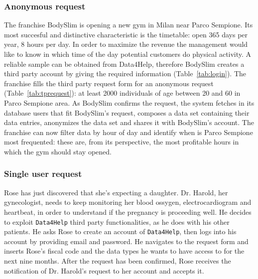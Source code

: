     \subsubsection{Anonymous request}

      The franchise BodySlim is opening a new gym in Milan near Parco Sempione. Its most succesful and distinctive characteristic is the timetable: open 365 days per year, 8 hours per day. In order to maximize the revenue the management would like to know in which time of the day potential customers do physical activity. A reliable sample can be obtained from Data4Help, therefore BodySlim creates a third party account by giving the required information (Table~\ref{tab:login}). The franchise fills the third party request form for an anonymous request (Table~\ref{tab:tprequest}): at least 2000 individuals of age between 20 and 60 in Parco Sempione area. As BodySlim confirms the request, the system fetches in its database users that fit BodySlim's request, composes a data set containing their data entries, anonymizes the data set and shares it with BodySlim's account. The franchise can now filter data by hour of day and identify when is Parco Sempione most frequented: these are, from its perspective, the most profitable hours in which the gym should stay opened.


    \subsubsection{Single user request}

      Rose has just discovered that she's expecting a daughter. Dr. Harold, her gynecologist, needs to keep monitoring her blood ossygen, electrocardiogram and heartbeat, in order to understand if the pregnancy is proceeding well. He decides to exploit \texttt{Data4Help} third party functionalities, as he does with his other patients. He asks Rose to create an account of \texttt{Data4Help}, then logs into his account by providing email and password. He navigates to the request form and inserts Rose's fiscal code and the data types he wants to have access to for the next nine months. After the request has been confirmed, Rose receives the notification of Dr. Harold's request to her account and accepts it.

